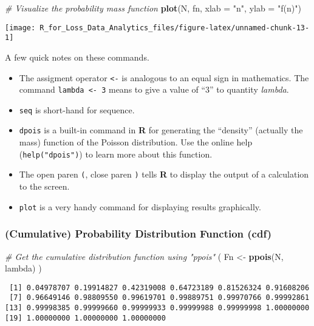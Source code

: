 \documentclass[]{book}
\newenvironment{Shaded}{\begin{snugshade}}{\end{snugshade}}
\newcommand{\KeywordTok}[1]{\textcolor[rgb]{0.13,0.29,0.53}{\textbf{#1}}}
\newcommand{\DataTypeTok}[1]{\textcolor[rgb]{0.13,0.29,0.53}{#1}}
\newcommand{\StringTok}[1]{\textcolor[rgb]{0.31,0.60,0.02}{#1}}
\newcommand{\CommentTok}[1]{\textcolor[rgb]{0.56,0.35,0.01}{\textit{#1}}}
\newcommand{\NormalTok}[1]{#1}
\providecommand{\tightlist}{%
  \setlength{\itemsep}{0pt}\setlength{\parskip}{0pt}}
\theoremstyle{definition}
\theoremstyle{definition}
\theoremstyle{definition}
\theoremstyle{remark}
\begin{document}
\begin{Shaded}
\begin{Highlighting}[]
\CommentTok{# Visualize the probability mass function }
\KeywordTok{plot}\NormalTok{(N, fn, }\DataTypeTok{xlab =} \StringTok{"n"}\NormalTok{, }\DataTypeTok{ylab =} \StringTok{"f(n)"}\NormalTok{) }
\end{Highlighting}
\end{Shaded}

\begin{center}\texttt{[image: R\_for\_Loss\_Data\_Analytics\_files/figure-latex/unnamed-chunk-13-1]} \end{center}

A few quick notes on these commands.

\begin{itemize}
\tightlist
\item
  The assigment operator \texttt{\textless{}-} is analogous to an equal
  sign in mathematics. The command \texttt{lambda\ \textless{}-\ 3}
  means to give a value of ``3'' to quantity \emph{lambda}.
\item
  \texttt{seq} is short-hand for sequence.
\item
  \texttt{dpois} is a built-in command in \textbf{R} for generating the
  ``density'' (actually the mass) function of the Poisson distribution.
  Use the online help (\texttt{help("dpois")}) to learn more about this
  function.
\item
  The open paren \texttt{(}, close paren \texttt{)} tells \textbf{R} to
  display the output of a calculation to the screen.
\item
  \texttt{plot} is a very handy command for displaying results
  graphically.
\end{itemize}

\subsubsection{(Cumulative) Probability Distribution Function
(cdf)}\label{cumulative-probability-distribution-function-cdf}

\begin{Shaded}
\begin{Highlighting}[]
\CommentTok{# Get the cumulative distribution function using "ppois"}
\NormalTok{( Fn <-}\StringTok{ }\KeywordTok{ppois}\NormalTok{(N, lambda) )}
\end{Highlighting}
\end{Shaded}

\begin{verbatim}
 [1] 0.04978707 0.19914827 0.42319008 0.64723189 0.81526324 0.91608206
 [7] 0.96649146 0.98809550 0.99619701 0.99889751 0.99970766 0.99992861
[13] 0.99998385 0.99999660 0.99999933 0.99999988 0.99999998 1.00000000
[19] 1.00000000 1.00000000 1.00000000
\end{verbatim}
\end{document}
